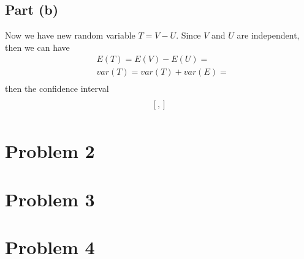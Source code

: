 \documentclass{report}
\begin{document}
\subsection*{Part (b)}
Now we have new random variable $ T=V-U $.  Since $V$ and $U$ are independent, then we can have
\begin{align*}
& E(T) = E(V)-E(U) =  \\
& var(T) = var(T)+var(E) = \\
\end{align*}
then the confidence interval  
\begin{align*}
[\hat{Y}-1.96\frac{\sigma}{\sqrt{n}}, \hat{Y}+1.96\frac{\sigma}{\sqrt{n}}]\\
[   ,  ]\\
\end{align*}
 
\section*{Problem 2}

\section*{Problem 3}

\section*{Problem 4} 
\end{document}
